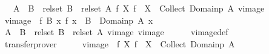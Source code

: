 \begin{isabellebody}
\ \ \ {\isachardoublequoteopen}{\isacharparenleft}{\kern0pt}{\isacharparenleft}{\kern0pt}A\ {\isacharequal}{\kern0pt}{\isacharequal}{\kern0pt}{\isacharequal}{\kern0pt}{\isachargreater}{\kern0pt}\ B{\isacharparenright}{\kern0pt}\ {\isacharequal}{\kern0pt}{\isacharequal}{\kern0pt}{\isacharequal}{\kern0pt}{\isachargreater}{\kern0pt}\ rel{\isacharunderscore}{\kern0pt}set\ B\ {\isacharequal}{\kern0pt}{\isacharequal}{\kern0pt}{\isacharequal}{\kern0pt}{\isachargreater}{\kern0pt}\ rel{\isacharunderscore}{\kern0pt}set\ A{\isacharparenright}{\kern0pt}\ {\isacharparenleft}{\kern0pt}{\isasymlambda}f\ X{\isachardot}{\kern0pt}\ f\ {\isacharminus}{\kern0pt}{\isacharbackquote}{\kern0pt}\ X\ {\isasyminter}\ Collect\ {\isacharparenleft}{\kern0pt}Domainp\ A{\isacharparenright}{\kern0pt}{\isacharparenright}{\kern0pt}\ vimage{\isachardoublequoteclose}\isanewline
%
\isadelimproof
%
\endisadelimproof
%
\isatagproof
{}\isamarkupfalse%
\ {\isacharminus}{\kern0pt}\isanewline
\ \ \isamarkupfalse%
\ {\isacharquery}{\kern0pt}vimage\ {\isacharequal}{\kern0pt}\ {\isachardoublequoteopen}{\isacharparenleft}{\kern0pt}{\isasymlambda}f\ B{\isachardot}{\kern0pt}\ {\isacharbraceleft}{\kern0pt}x{\isachardot}{\kern0pt}\ f\ x\ {\isasymin}\ B\ {\isasymand}\ Domainp\ A\ x{\isacharbraceright}{\kern0pt}{\isacharparenright}{\kern0pt}{\isachardoublequoteclose}\isanewline
\ \ \isamarkupfalse%
\ {\isachardoublequoteopen}{\isacharparenleft}{\kern0pt}{\isacharparenleft}{\kern0pt}A\ {\isacharequal}{\kern0pt}{\isacharequal}{\kern0pt}{\isacharequal}{\kern0pt}{\isachargreater}{\kern0pt}\ B{\isacharparenright}{\kern0pt}\ {\isacharequal}{\kern0pt}{\isacharequal}{\kern0pt}{\isacharequal}{\kern0pt}{\isachargreater}{\kern0pt}\ rel{\isacharunderscore}{\kern0pt}set\ B\ {\isacharequal}{\kern0pt}{\isacharequal}{\kern0pt}{\isacharequal}{\kern0pt}{\isachargreater}{\kern0pt}\ rel{\isacharunderscore}{\kern0pt}set\ A{\isacharparenright}{\kern0pt}\ {\isacharquery}{\kern0pt}vimage\ vimage{\isachardoublequoteclose}\isanewline
\ \ \ \ \isamarkupfalse%
\ vimage{\isacharunderscore}{\kern0pt}def\isanewline
\ \ \ \ \isamarkupfalse%
\ transfer{\isacharunderscore}{\kern0pt}prover\isanewline
\ \ \isamarkupfalse%
\ \isamarkupfalse%
\ {\isachardoublequoteopen}{\isacharquery}{\kern0pt}vimage\ {\isacharequal}{\kern0pt}\ {\isacharparenleft}{\kern0pt}{\isasymlambda}f\ X{\isachardot}{\kern0pt}\ f\ {\isacharminus}{\kern0pt}{\isacharbackquote}{\kern0pt}\ X\ {\isasyminter}\ Collect\ {\isacharparenleft}{\kern0pt}Domainp\ A{\isacharparenright}{\kern0pt}{\isacharparenright}{\kern0pt}{\isachardoublequoteclose}\isanewline

\end{isabellebody}
